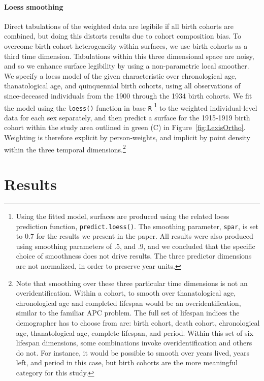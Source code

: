 \documentclass[11pt,oneside,a4paper]{article}
\begin{document}
\paragraph*{Loess smoothing}
Direct tabulations of the weighted data are legibile if all birth
cohorts are combined, but doing this distorts results due to cohort
composition bias. To overcome birth cohort heterogeneity within surfaces,
we use birth cohorts as a third time dimension. Tabulations within this three dimensional space are noisy, and so we
enhance surface legibility by using a non-parametric local smoother.
We specify a loess model of the given characteristic over chronological age,
thanatological age, and quinquennial birth cohorts, using all observations of since-deceased individuals from the 1900 through the 1934 birth cohorts. We fit the model using the \texttt{loess()} function in base \texttt{R} \citep{cleveland1992local,Rcore2013}\footnote{Using the fitted model, surfaces are produced using the related loess prediction function, \texttt{predict.loess()}. The smoothing parameter, \texttt{spar}, is set to 0.7 for the results we present in the paper.
All results were also produced using smoothing parameters of .5, and .9, and
we concluded that the specific choice of smoothness does not drive results.
The three predictor dimensions are not normalized, in order to preserve year
units. } to the weighted individual-level data for each sex separately, and then
predict a surface for the 1915-1919 birth cohort within the study area outlined
in green (C) in Figure~\ref{fig:LexisOrtho}. Weighting is therefore explicit by
person-weights, and implicit by point density within the three temporal
dimensions.\footnote{Note that smoothing over these three particular time dimensions is not an
overidentification. Within a cohort, to smooth over thanatological age,
chronological age and completed lifespan would be an overidentification, similar
to the familiar APC problem. The full set of lifespan indices the
demographer has to choose from are: birth cohort, death cohort,
chronological age, thanatological age, complete lifespan, and period. Within
this set of six lifespan dimensions, some combinations invoke overidentification
and others do not. For instance, it would be possible to smooth over years
lived, years left, and period in this case, but birth cohorts are the more
meaningful category for this study.}

\section*{Results}
\end{document}
